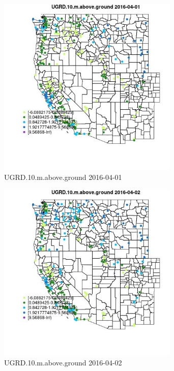 \begin{figure} 
\centering  
\includegraphics[width=0.77\textwidth]{Code_Outputs/Report_ML_input_PM25_Step4_part_e_de_duplicated_aveswNAs_MapObsUGRD10maboveground2016-04-01.jpg} 
\caption{\label{fig:Report_ML_input_PM25_Step4_part_e_de_duplicated_aveswNAsMapObsUGRD10maboveground2016-04-01}UGRD.10.m.above.ground 2016-04-01} 
\end{figure} 
 

\begin{figure} 
\centering  
\includegraphics[width=0.77\textwidth]{Code_Outputs/Report_ML_input_PM25_Step4_part_e_de_duplicated_aveswNAs_MapObsUGRD10maboveground2016-04-02.jpg} 
\caption{\label{fig:Report_ML_input_PM25_Step4_part_e_de_duplicated_aveswNAsMapObsUGRD10maboveground2016-04-02}UGRD.10.m.above.ground 2016-04-02} 
\end{figure} 
 

